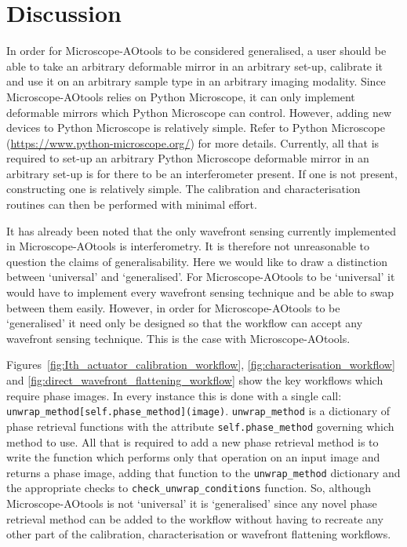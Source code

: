 \section{Discussion}

In order for Microscope-AOtools to be considered generalised, a user should be able to take an arbitrary deformable mirror in an arbitrary set-up, calibrate it and use it on an arbitrary sample type in an arbitrary imaging modality. Since Microscope-AOtools relies on Python Microscope, it can only implement deformable mirrors which Python Microscope can control. However, adding new devices to Python Microscope is relatively simple. Refer to Python Microscope (\url{https://www.python-microscope.org/}) for more details. Currently, all that is required to set-up an arbitrary Python Microscope deformable mirror in an arbitrary set-up is for there to be an interferometer present. If one is not present, constructing one is relatively simple. The calibration and characterisation routines can then be performed with minimal effort. 

It has already been noted that the only wavefront sensing currently implemented in Microscope-AOtools is interferometry. It is therefore not unreasonable to question the claims of generalisability. Here we would like to draw a distinction between `universal' and `generalised'. For Microscope-AOtools to be `universal' it would have to implement every wavefront sensing technique and be able to swap between them easily. However, in order for Microscope-AOtools to be `generalised' it need only be designed so that the workflow can accept any wavefront sensing technique. This is the case with Microscope-AOtools. 

Figures~\ref{fig:Ith_actuator_calibration_workflow}, \ref{fig:characterisation_workflow} and \ref{fig:direct_wavefront_flattening_workflow} show the key workflows which require phase images. In every instance this is done with a single call: \lstinline|unwrap_method[self.phase_method](image)|. \lstinline|unwrap_method| is a dictionary of phase retrieval functions with the attribute \lstinline|self.phase_method| governing which method to use. All that is required to add a new phase retrieval method is to write the function which performs only that operation on an input image and returns a phase image, adding that function to the \lstinline|unwrap_method| dictionary and the appropriate checks to \lstinline|check_unwrap_conditions| function. So, although Microscope-AOtools is not `universal' it is `generalised' since any novel phase retrieval method can be added to the workflow without having to recreate any other part of the calibration, characterisation or wavefront flattening workflows. 

